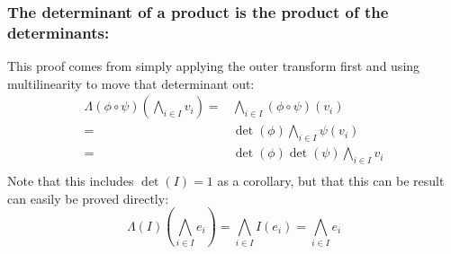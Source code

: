\subsubsection{The determinant of a product is the product of the determinants:}
This proof comes from simply applying the outer transform first and using multilinearity to move that determinant out:
\[\begin{aligned}
	\Lambda(\phi\circ\psi)\left(\bigwedge_{i\in I}v_i\right) =&\bigwedge_{i\in I}(\phi\circ\psi)(v_i) \\
	=&\det(\phi)\bigwedge_{i\in I}\psi(v_i) \\
	=&\det(\phi)\det(\psi)\bigwedge_{i\in I}v_i \\
\end{aligned}\]
Note that this includes $\det(I) = 1$ as a corollary,
but that this can be result can easily be proved directly:
\[\Lambda(I)\left(\bigwedge_{i\in I}e_i\right) = \bigwedge_{i\in I}I(e_i) = \bigwedge_{i\in I}e_i\]
	
